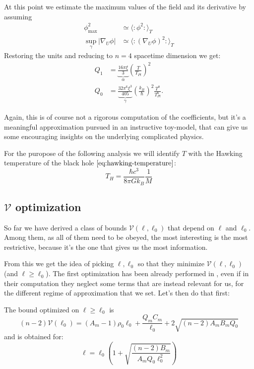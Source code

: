 At this point we estimate the maximum values of the field and its derivative by assuming 
\begin{align*}
	\phi_{\max}^2 &\simeq \langle \colon \phi^2 \colon\rangle_T\\
	\sup_{\gamma}\vert \nabla_U\phi\vert &\simeq \langle \colon (\nabla_U\phi)^2 \colon\rangle_T
\end{align*}
Restoring the units and reducing to \(n = 4\) spacetime dimension we get:
\begin{align}
	\label{eq:KMS_Q_1}
    Q_1 &= \underbrace{\frac{16\pi\xi}{3}}_{\alpha} \left(\frac{T}{T_{Pl}}\right)^2 \\
    Q_0 &= \underbrace{\frac{32\pi^6\xi^3}{405}}_{\gamma}\left(\frac{k_B}{\hbar}\right)^2 \frac{T^8}{T_{Pl}^6}.
\end{align}

Again, this is of course not a rigorous computation of the coefficients, but it's a meaningful approximation pursued in an instructive toy-model, that can give us some encouraging insights on the underlying complicated physics.

For the puropose of the following analysis we will identify \(T\) with the Hawking temperature of the black hole \(\eqref{eq:hawking-temperature}\):
\[
T_H = \frac{\hbar c^3}{8\pi Gk_B}\frac{1}{M}    
\]
    

\subsection[V-optimization]{\(\mathcal{V}\) optimization}
So far we have derived a class of bounds \(\mathcal{V}(\ell, \ell_0)\) that depend on \(\ell\) and \(\ell_0\). Among them, as all of them need to be obeyed, the most interesting is the most restrictive, because it's the one that gives us the most information.

From this we get the idea of picking \(\ell, \ell_0\) so that they minimize \(\mathcal{V}(\ell, \ell_0)\) (and \(\ell \ge \ell_0\)).
The first optimization has been already performed in \cite{fewster2020new}, even if in their computation they neglect some terms that are instead relevant for us, for the different regime of approximation that we set. Let's then do that first:

\begin{prop}
    The bound optimized on \(\ell \ge \ell_0\) is
    \[
      (n-2)\mathcal{V}(\ell_0) = (A_m - 1)\rho_0\ell_0 + \frac{Q_mC_m}{\ell_0} + 2 \sqrt{(n - 2)A_mB_mQ_0}   
    \]
    and is obtained for:
    \[
    \ell = \ell_0\left(1 + \sqrt{\frac{(n - 2) B_m}{A_m Q_0\ell_0^2}}\right)    
    \]
\end{prop}

